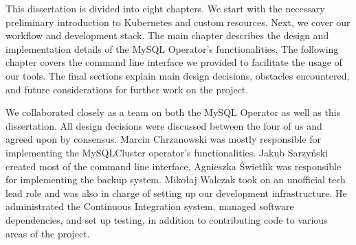 This dissertation is divided into eight chapters. We start with the necessary
preliminary introduction to Kubernetes and custom resources. Next, we cover
our workflow and development stack. The main chapter describes the design and
implementation details of the MySQL Operator's functionalities. The following
chapter covers the command line interface we  provided to facilitate the usage
of our tools. The final sections explain main  design decisions, obstacles encountered,
and future considerations for further work on the project.

We collaborated closely as a team on both the MySQL Operator as well as this
dissertation. All design decisions were discussed between the four of us and
agreed upon by consensus. Marcin Chrzanowski was mostly responsible for
implementing the MySQLCluster operator's functionalities. Jakub Sarzyński
created most of the command line interface. Agnieszka Świetlik was responsible
for implementing the backup system. Mikołaj Walczak took on an unofficial tech
lead role and was also in charge of setting up our development infrastructure.
He administrated the Continuous Integration system, managed software
dependencies, and set up testing, in addition to contributing code to various
areas of the project.
